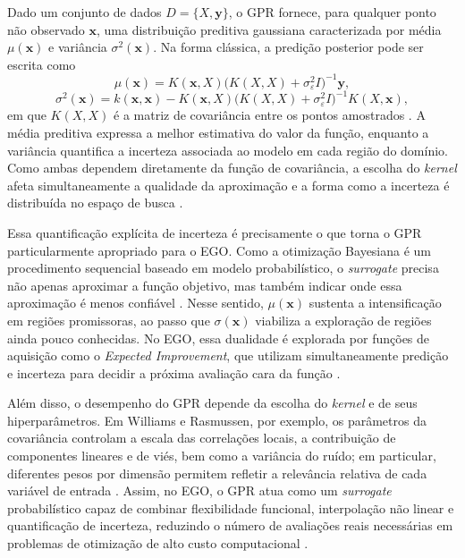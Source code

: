 Dado um conjunto de dados \(D=\{X,\mathbf{y}\}\), o GPR fornece, para qualquer ponto não observado \(\mathbf{x}\), uma distribuição preditiva gaussiana caracterizada por média \(\mu(\mathbf{x})\) e variância \(\sigma^2(\mathbf{x})\). Na forma clássica, a predição posterior pode ser escrita como
\begin{equation}
    \mu(\mathbf{x}) = K(\mathbf{x},X)\big(K(X,X)+\sigma_\varepsilon^2 I\big)^{-1}\mathbf{y},
\end{equation}
\begin{equation}
    \sigma^2(\mathbf{x}) = k(\mathbf{x},\mathbf{x}) - K(\mathbf{x},X)\big(K(X,X)+\sigma_\varepsilon^2 I\big)^{-1}K(X,\mathbf{x}),
\end{equation}
em que \(K(X,X)\) é a matriz de covariância entre os pontos amostrados \cite{NIPS1995_7cce53cf}. A média preditiva expressa a melhor estimativa do valor da função, enquanto a variância quantifica a incerteza associada ao modelo em cada região do domínio. Como ambas dependem diretamente da função de covariância, a escolha do \textit{kernel} afeta simultaneamente a qualidade da aproximação e a forma como a incerteza é distribuída no espaço de busca \cite{NIPS1995_7cce53cf}.

Essa quantificação explícita de incerteza é precisamente o que torna o GPR particularmente apropriado para o EGO. Como a otimização Bayesiana é um procedimento sequencial baseado em modelo probabilístico, o \textit{surrogate} precisa não apenas aproximar a função objetivo, mas também indicar onde essa aproximação é menos confiável \cite{Shahriari2016}. Nesse sentido, \(\mu(\mathbf{x})\) sustenta a intensificação em regiões promissoras, ao passo que \(\sigma(\mathbf{x})\) viabiliza a exploração de regiões ainda pouco conhecidas. No EGO, essa dualidade é explorada por funções de aquisição como o \textit{Expected Improvement}, que utilizam simultaneamente predição e incerteza para decidir a próxima avaliação cara da função \cite{Jones1998,Shahriari2016}.

Além disso, o desempenho do GPR depende da escolha do \textit{kernel} e de seus hiperparâmetros. Em Williams e Rasmussen, por exemplo, os parâmetros da covariância controlam a escala das correlações locais, a contribuição de componentes lineares e de viés, bem como a variância do ruído; em particular, diferentes pesos por dimensão permitem refletir a relevância relativa de cada variável de entrada \cite{NIPS1995_7cce53cf}. Assim, no EGO, o GPR atua como um \textit{surrogate} probabilístico capaz de combinar flexibilidade funcional, interpolação não linear e quantificação de incerteza, reduzindo o número de avaliações reais necessárias em problemas de otimização de alto custo computacional \cite{Jones1998,Shahriari2016}.
